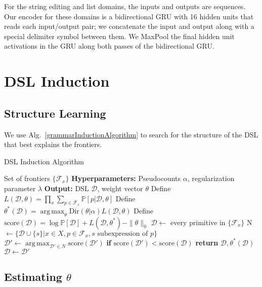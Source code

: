 \documentclass{article}
\DeclareMathOperator*{\argmax}{arg\,max} %
\newcommand{\probability}{\mathds{P}} %
\begin{document}
For the string editing and list domains,
the inputs and outputs are sequences. Our encoder for these domains is a bidirectional GRU with 16 hidden units that reads each input/output pair; we concatenate the input and output along with a special delimiter
symbol between them.
We MaxPool the final hidden unit activations in the GRU along both passes of the bidirectional GRU.

\section{DSL Induction}

\subsection{Structure Learning}

We use Alg.~\ref{grammarInductionAlgorithm} to search for the structure of the DSL that best explains the frontiers.

\setcounter{algorithm}{2} %
\begin{algorithm}[hb]
   \caption{DSL Induction Algorithm}
   \label{grammarInductionAlgorithm}
   \begin{algorithmic}
      Set of frontiers $\{\mathcal{F}_x\}$
     \STATE \textbf{Hyperparameters:} Pseudocounts $\alpha$, regularization parameter $\lambda$
     \STATE \textbf{Output:} DSL $\mathcal{D}$, weight vector $\theta$
     \STATE Define $L(\mathcal{D},\theta) =  \prod_x \sum_{p\in \mathcal{F}_x} \probability[p|\mathcal{D},\theta]$
     \STATE Define $\theta^*(\mathcal{D}) = \argmax_\theta \text{Dir}(\theta|\alpha) L(\mathcal{D},\theta)$
     \STATE Define $\text{score}(\mathcal{D}) = \log \probability[\mathcal{D}] + L(\mathcal{D},\theta^*) - \|\theta\|_0$
     \STATE $\mathcal{D}\gets$ every primitive in $\{\mathcal{F}_x\}$
     \STATE N $\gets \{\mathcal{D}\cup \{s\} | x\in X, p\in \mathcal{F}_x, s\text{ subexpression of }p\}$
     \STATE $\mathcal{D}'\gets \argmax_{\mathcal{D}'\in N}\text{score}(\mathcal{D}') $
     \STATE \textbf{if }$\text{score}(\mathcal{D}') < \text{score}(\mathcal{D})$\textbf{ return }$\mathcal{D},\theta^*(\mathcal{D})$
     \STATE $\mathcal{D}\gets\mathcal{D}'$
     \ENDWHILE
   \end{algorithmic}
\end{algorithm}

\subsection{Estimating $\theta$}
\end{document}
